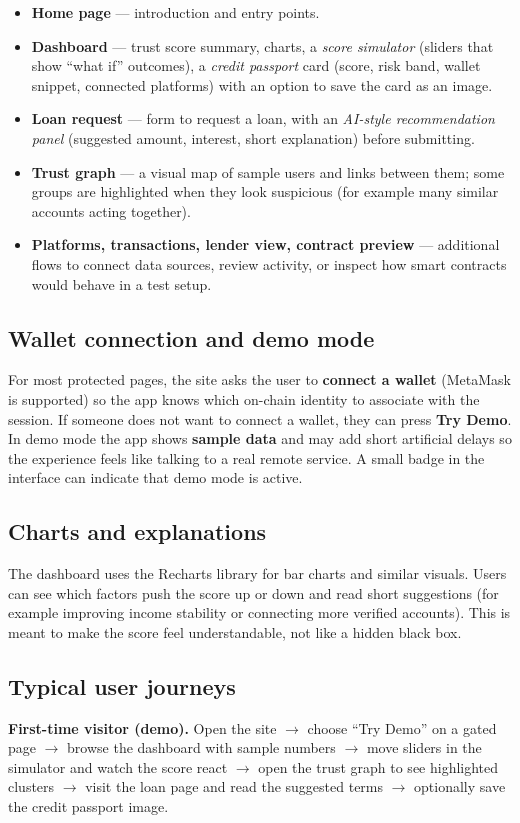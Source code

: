 \documentclass[11pt,a4paper]{article}
\begin{document}
\begin{itemize}[leftmargin=*]
  \item \textbf{Home page} --- introduction and entry points.
  \item \textbf{Dashboard} --- trust score summary, charts, a \emph{score simulator} (sliders that show ``what if'' outcomes), a \emph{credit passport} card (score, risk band, wallet snippet, connected platforms) with an option to save the card as an image.
  \item \textbf{Loan request} --- form to request a loan, with an \emph{AI-style recommendation panel} (suggested amount, interest, short explanation) before submitting.
  \item \textbf{Trust graph} --- a visual map of sample users and links between them; some groups are highlighted when they look suspicious (for example many similar accounts acting together).
  \item \textbf{Platforms, transactions, lender view, contract preview} --- additional flows to connect data sources, review activity, or inspect how smart contracts would behave in a test setup.
\end{itemize}

\subsection{Wallet connection and demo mode}
For most protected pages, the site asks the user to \textbf{connect a wallet} (MetaMask is supported) so the app knows which on-chain identity to associate with the session. If someone does not want to connect a wallet, they can press \textbf{Try Demo}. In demo mode the app shows \textbf{sample data} and may add short artificial delays so the experience feels like talking to a real remote service. A small badge in the interface can indicate that demo mode is active.

\subsection{Charts and explanations}
The dashboard uses the Recharts library for bar charts and similar visuals. Users can see which factors push the score up or down and read short suggestions (for example improving income stability or connecting more verified accounts). This is meant to make the score feel understandable, not like a hidden black box.

\subsection{Typical user journeys}
\textbf{First-time visitor (demo).} Open the site $\rightarrow$ choose ``Try Demo'' on a gated page $\rightarrow$ browse the dashboard with sample numbers $\rightarrow$ move sliders in the simulator and watch the score react $\rightarrow$ open the trust graph to see highlighted clusters $\rightarrow$ visit the loan page and read the suggested terms $\rightarrow$ optionally save the credit passport image.
\end{document}
